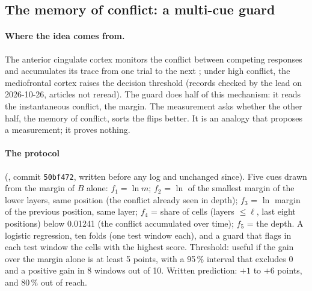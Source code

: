 \subsection{The memory of conflict: a multi-cue guard}\label{t3tro:sec:indices}

\paragraph{Where the idea comes from.} The anterior cingulate cortex monitors the conflict between competing responses and accumulates its trace from one trial to the next \cite{botvinick2001conflict}; under high conflict, the mediofrontal cortex raises the decision threshold \cite{cavanagh2011subthalamic} (records checked by the lead on 2026-10-26, articles not reread). The guard does half of this mechanism: it reads the instantaneous conflict, the margin. The measurement asks whether the other half, the memory of conflict, sorts the flips better. It is an analogy that proposes a measurement; it proves nothing.

\paragraph{The protocol} (, commit \texttt{50bf472}, written before any log and unchanged since). Five cues drawn from the margin of $B$ alone: $f_1 = \ln m$; $f_2$ = $\ln$ of the smallest margin of the lower layers, same position (the conflict already seen in depth); $f_3$ = $\ln$ margin of the previous position, same layer; $f_4$ = share of cells (layers $\le \ell$, last eight positions) below 0.01241 (the conflict accumulated over time); $f_5$ = the depth. A logistic regression, ten folds (one test window each), and a guard that flags in each test window the cells with the highest score. Threshold: useful if the gain over the margin alone is at least 5 points, with a 95\,\% interval that excludes 0 and a positive gain in 8 windows out of 10. Written prediction: $+1$ to $+6$ points, and 80\,\% out of reach.


